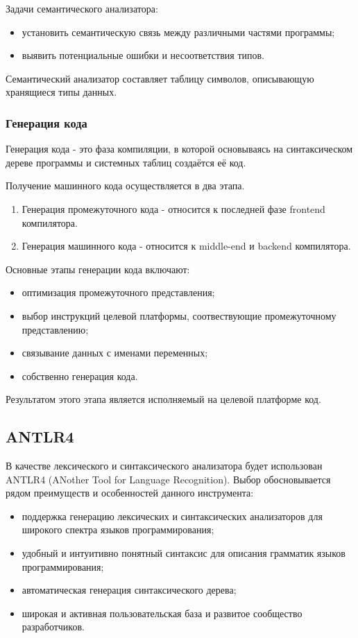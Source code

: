 Задачи семантического анализатора:
\begin{itemize}
    \item установить семантическую связь между различными частями программы;
    \item выявить потенциальные ошибки и несоответствия типов.
\end{itemize}

Семантический анализатор составляет таблицу символов, описывающую хранящиеся типы данных.

\subsubsection{Генерация кода}
Генерация кода - это фаза компиляции, в которой основываясь на синтаксическом дереве программы и системных таблиц создаётся её код.

Получение машинного кода осуществляется в два этапа.
\begin{enumerate}
    \item Генерация промежуточного кода - относится к последней фазе frontend компилятора.
    \item Генерация машинного кода - относится к middle-end и backend компилятора.
\end{enumerate}

Основные этапы генерации кода включают:
\begin{itemize}
    \item оптимизация промежуточного представления;
    \item выбор инструкций целевой платформы, соотвествующие промежуточному представлению;
    \item связывание данных с именами переменных;
    \item собственно генерация кода.
\end{itemize}

Результатом этого этапа является исполняемый на целевой платформе код.

\subsection{ANTLR4}
В качестве лексического и синтаксического анализатора будет использован ANTLR4 (ANother Tool for Language Recognition). Выбор обосновывается рядом преимуществ и особенностей данного инструмента:

\begin{itemize}
    \item поддержка генерацию лексических и синтаксических анализаторов для широкого спектра языков программирования;
    \item удобный и интуитивно понятный синтаксис для описания грамматик языков программирования;
    \item автоматическая генерация синтаксического дерева;
    \item широкая и активная пользовательская база и развитое сообщество разработчиков.
\end{itemize}

